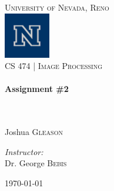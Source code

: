 \begin{titlepage}
\begin{center}

\textsc{\LARGE University of Nevada, Reno}\\[.5cm]
\includegraphics[width=0.15\textwidth]{./logo.png}\\[.5cm]

\textsc{\large CS 474 | Image Processing } \\[.5cm]

\HRule \\[0.4cm]
{ \huge \bfseries Assignment \#2}\\[0.4cm]

\HRule \\[1.5cm]

\begin{minipage}{0.4\textwidth}
\begin{flushleft} \large
\emph{}\\
    Joshua \textsc{Gleason}\\
    \end{flushleft}
    \end{minipage}
    \begin{minipage}{0.4\textwidth}
    \begin{flushright} \large
    \emph{Instructor:} \\
      Dr. George \textsc{Bebis}
      \end{flushright}
      \end{minipage}

      \vspace*{\fill}

      

      \vspace*{\fill}

{\large \today}

\end{center}

\end{titlepage}

